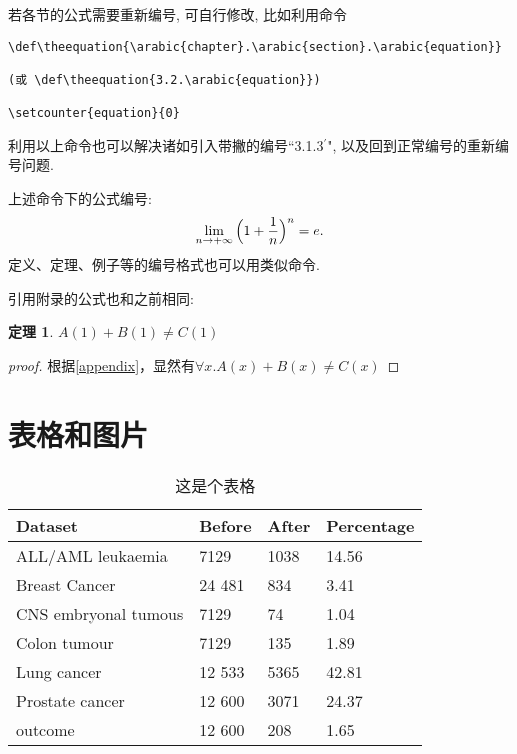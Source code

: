 \documentclass[notitlepage,cs4size,punct,oneside]{ctexrep}
\numberwithin{equation}{chapter}
\theoremstyle{mystyle}
\newtheorem{theorem}[definition]{\hspace{2em}定理}
\def\theequation{\arabic{chapter}.\arabic{equation}}
\begin{document}
若各节的公式需要重新编号, 可自行修改, 比如利用命令
\begin{verbatim}
\def\theequation{\arabic{chapter}.\arabic{section}.\arabic{equation}}

(或 \def\theequation{3.2.\arabic{equation}})

\setcounter{equation}{0}
\end{verbatim}
利用以上命令也可以解决诸如引入带撇的编号``3.1.3$^\prime$", 以及回到正常编号的重新编号问题.

\def\theequation{\arabic{chapter}.\arabic{section}.\arabic{equation}}
\setcounter{equation}{0}

上述命令下的公式编号:
\begin{equation}
\lim_{n\to +\infty}\Big(1+{1\over n}\Big)^n=e.
\end{equation}
定义、定理、例子等的编号格式也可以用类似命令. 

引用附录的公式也和之前相同: 

\begin{theorem}
$A(1) + B(1) \neq C(1)$
    
\end{theorem}
\begin{proof}[proof]
    根据\ref{appendix}，显然有$\forall x. A(x) + B(x) \neq C(x)$
\end{proof}


\chapter{表格和图片}
\begin{table}[htbp]\centering
\begin{tabular}{llll}
\hline\hline
Dataset             & Before      & After     & Percentage \\
\hline
ALL/AML leukaemia   & 7129        & 1038      & 14.56      \\
Breast Cancer       & 24 481      & 834       & 3.41       \\
CNS embryonal tumous& 7129        & 74        & 1.04       \\
Colon tumour        & 7129        & 135       & 1.89       \\
Lung cancer         & 12 533      & 5365      & 42.81      \\
Prostate cancer     & 12 600      & 3071      & 24.37      \\
outcome             & 12 600      & 208       & 1.65       \\
\hline
\end{tabular}
\caption{这是个表格}\label{tab:hh}
\end{table}
\end{document}
